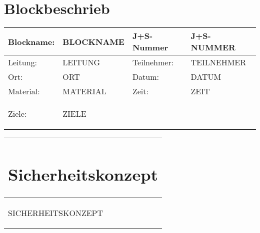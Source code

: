 \documentclass[12pt]{article}
\newcommand{\tstamp}{DATUM}
\begin{document}
\section*{Blockbeschrieb}
	\begin{tabular}{|p{2.5cm}|p{5.5cm}|p{2.5cm}|p{5.5cm}|}
	\hline
	Blockname: 	& BLOCKNAME	& J+S-Nummer	& J+S-NUMMER \\ \hline
	Leitung:		& LEITUNG		& Teilnehmer:	& TEILNEHMER \\ \hline
	Ort:			& ORT			& Datum:		& \tstamp \\ \hline
	Material:		& MATERIAL		& Zeit:		& ZEIT \\ \hline
	Ziele:		&  \multicolumn{3}{p{13.5cm+4\tabcolsep+2\arrayrulewidth}|}{\begin{compactitem} %
		\item ZIELE %
 	\end{compactitem}} \\
	\hline
\end{tabular}



\begin{tabular}{|p{17.5cm+3\arrayrulewidth}|}
	\hline
	\parbox[0pt][1.5cm][c]{0cm}{\section*{Sicherheitskonzept}}\\
	\hline
	\begin{compactitem}
		 \item SICHERHEITSKONZEPT
 	\end{compactitem}\\
 	\hline 
\end{tabular}
\end{document}
